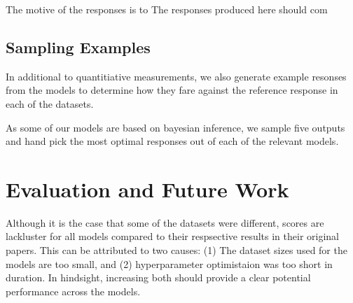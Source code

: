 \documentclass[12pt,twoside]{report}
\begin{document}
The motive of the responses is to 
The responses produced here should com

\section{Sampling Examples}

In additional to quantitiative measurements, we also generate example resonses from the models to determine how they fare against the reference response in each of the datasets.


As some of our models are based on bayesian inference, we sample five outputs and hand pick the most optimal responses out of each of the relevant models. 


\chapter{Evaluation and Future Work}

Although it is the case that some of the datasets were different,  scores are lackluster for all models compared to their respsective results in their original papers. This can be attributed to two causes: (1) The dataset sizes used for the models are too small, and (2) hyperparameter optimistaion was too short in duration. In hindsight, increasing both should provide a clear potential performance across the models. 
\end{document}
